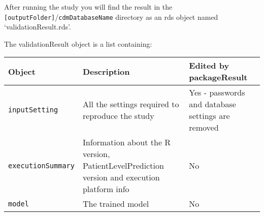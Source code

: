 \documentclass[
]{article}
\begin{document}
After running the study you will find the result in the
\texttt{{[}outputFolder{]}}/\texttt{cdmDatabaseName} directory as an rds
object named `validationResult.rds'.

The validationResult object is a list containing:

\begin{longtable}[]{@{}lll@{}}
\toprule
\begin{minipage}[b]{0.23\columnwidth}\raggedright
Object\strut
\end{minipage} & \begin{minipage}[b]{0.51\columnwidth}\raggedright
Description\strut
\end{minipage} & \begin{minipage}[b]{0.17\columnwidth}\raggedright
Edited by packageResult\strut
\end{minipage}\tabularnewline
\midrule
\endhead
\begin{minipage}[t]{0.23\columnwidth}\raggedright
\texttt{inputSetting}\strut
\end{minipage} & \begin{minipage}[t]{0.51\columnwidth}\raggedright
All the settings required to reproduce the study\strut
\end{minipage} & \begin{minipage}[t]{0.17\columnwidth}\raggedright
Yes - passwords and database settings are removed\strut
\end{minipage}\tabularnewline
\begin{minipage}[t]{0.23\columnwidth}\raggedright
\texttt{executionSummary}\strut
\end{minipage} & \begin{minipage}[t]{0.51\columnwidth}\raggedright
Information about the R version, PatientLevelPrediction version and
execution platform info\strut
\end{minipage} & \begin{minipage}[t]{0.17\columnwidth}\raggedright
No\strut
\end{minipage}\tabularnewline
\begin{minipage}[t]{0.23\columnwidth}\raggedright
\texttt{model}\strut
\end{minipage} & \begin{minipage}[t]{0.51\columnwidth}\raggedright
The trained model\strut
\end{minipage} & \begin{minipage}[t]{0.17\columnwidth}\raggedright
No\strut
\end{minipage}\tabularnewline

\end{longtable}
\end{document}
